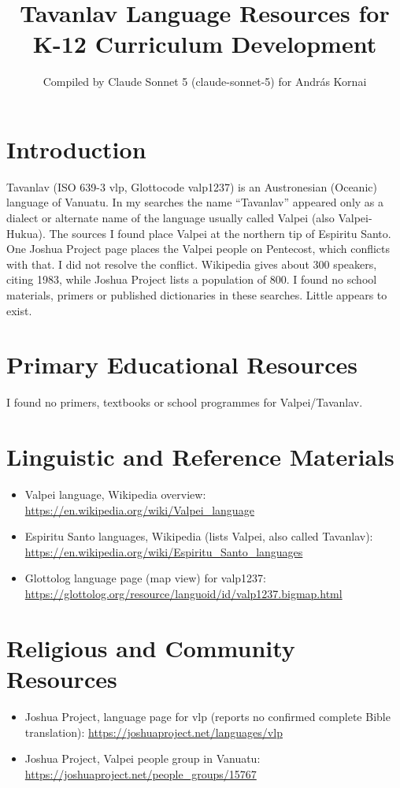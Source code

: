 \documentclass[12pt]{article}
\title{Tavanlav Language Resources for K-12 Curriculum Development}
\author{Compiled by Claude Sonnet 5 (claude-sonnet-5) for Andr\'as Kornai}
\date{}
\begin{document}
\maketitle

\section{Introduction}
Tavanlav (ISO 639-3 vlp, Glottocode valp1237) is an Austronesian (Oceanic) language of Vanuatu. In my searches the name ``Tavanlav'' appeared only as a dialect or alternate name of the language usually called Valpei (also Valpei-Hukua). The sources I found place Valpei at the northern tip of Espiritu Santo. One Joshua Project page places the Valpei people on Pentecost, which conflicts with that. I did not resolve the conflict. Wikipedia gives about 300 speakers, citing 1983, while Joshua Project lists a population of 800. I found no school materials, primers or published dictionaries in these searches. Little appears to exist.

\section{Primary Educational Resources}
I found no primers, textbooks or school programmes for Valpei/Tavanlav.

\section{Linguistic and Reference Materials}
\begin{itemize}
\item Valpei language, Wikipedia overview: \url{https://en.wikipedia.org/wiki/Valpei_language}
\item Espiritu Santo languages, Wikipedia (lists Valpei, also called Tavanlav): \url{https://en.wikipedia.org/wiki/Espiritu_Santo_languages}
\item Glottolog language page (map view) for valp1237: \url{https://glottolog.org/resource/languoid/id/valp1237.bigmap.html}
\end{itemize}

\section{Religious and Community Resources}
\begin{itemize}
\item Joshua Project, language page for vlp (reports no confirmed complete Bible translation): \url{https://joshuaproject.net/languages/vlp}
\item Joshua Project, Valpei people group in Vanuatu: \url{https://joshuaproject.net/people_groups/15767}
\end{itemize}
\end{document}
